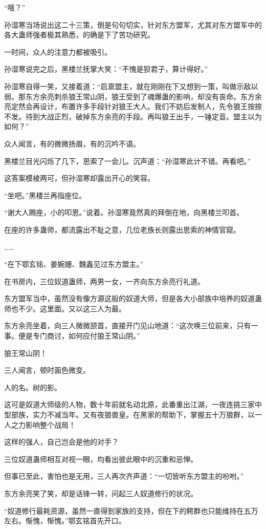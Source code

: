\begin{this_body}
“哦？”

孙湿寒当场说出这二十三策，倒是句句切实，针对东方盟军，尤其对东方盟军中的各大蛊师强者极其熟悉，的确是下了苦功研究。

一时间，众人的注意力都被吸引。

孙湿寒说完之后，黑楼兰抚掌大笑：“不愧是狈君子，算计得好。”

孙湿寒自得一笑，又接着道：“启禀盟主，就在刚刚在下又想到一策，叫做示敌以弱。那东方余亮刺杀狼王常山阴，狼王受到了魂爆蛊的影响，却没有丧命。东方余亮定然会再设计，布置许多手段针对狼王大人。我们不妨后发制人，先令狼王按捺不发。待到大战正烈，破掉东方余亮的手段。再叫狼王出手，一锤定音。盟主以为如何？”

众人闻言，有的微微扬眉，有的沉吟不语。

黑楼兰目光闪烁了几下，思索了一会儿。沉声道：“孙湿寒此计不错。再看吧。”

这答案模棱两可，但孙湿寒却露出开心的笑容。

“坐吧。”黑楼兰再指座位。

“谢大人赐座，小的叩恩。”说着。孙湿寒竟然真的拜倒在地，向黑楼兰叩首。

在座的许多蛊师，都流露出不耻之意，几位老族长则露出思索的神情官窥。

……

“在下鄂玄铭、姜婉姗、魏鑫见过东方盟主。”

在书房内，三位奴道蛊师，两男一女，一齐向东方余亮行礼道。

东方盟军当中，虽然没有像方源这般的奴道大师，但是各大小部族中培养的奴道蛊师也不少。这里面。又以这三人为最。

东方余亮坐着，向三人微微颔首，直接开门见山地道：“这次唤三位前来，只有一事。便是专门商讨，如何应付狼王常山阴。”

狼王常山阴！

三人闻言，顿时面色微变。

人的名。树的影。

这可是奴道大师级的人物，数十年前就名动北原，此番重出江湖，一夜连挑三家中型部族，实力不减当年。又有夜狼兽皇。在黑家的帮助下，掌握五十万狼群，以一人之力影响整个战局！

这样的强人，自己岂会是他的对手？

三位奴道蛊师相互对视一眼，均看出彼此眼中的沉重和忌惮。

但事已至此，害怕也是无用，三人再次齐声道：“一切皆听东方盟主的吩咐。”

东方余亮笑了笑，却是话锋一转，问起三人奴道修行的状况。

“奴道修行最耗资源，虽然一直得到家族的支持，但在下的鳄群也只能维持在五万左右。惭愧，惭愧。”鄂玄铭首先开口。


\end{this_body}
